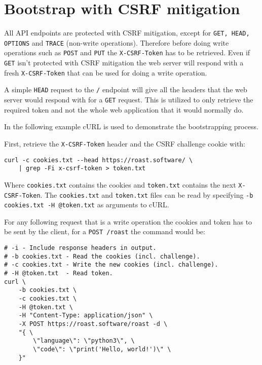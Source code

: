 \documentclass[12pt,a4paper]{report}
\begin{document}
\section{Bootstrap with CSRF mitigation}
\label{sec:api-bootstrap}
All API endpoints are protected with CSRF mitigation, except for \texttt{GET, HEAD, OPTIONS} and \texttt{TRACE} (non-write operations). Therefore before doing write operations such as \texttt{POST} and \texttt{PUT} the \texttt{X-CSRF-Token} has to be retrieved. Even if \texttt{GET} isn't protected with CSRF mitigation the web server will respond with a fresh \texttt{X-CSRF-Token} that can be used for doing a write operation.

A simple \texttt{HEAD} request to the \texttt{/} endpoint will give all the headers that the web server would respond with for a \texttt{GET} request. This is utilized to only retrieve the required token and not the whole web application that it would normally do.

In the following example cURL is used to demonstrate the bootstrapping process.

First, retrieve the \texttt{X-CSRF-Token} header and the CSRF challenge cookie with:
\begin{verbatim}
curl -c cookies.txt --head https://roast.software/ \
    | grep -Fi x-csrf-token > token.txt
\end{verbatim}
Where \texttt{cookies.txt} contains the cookies and \texttt{token.txt} contains the next \texttt{X-CSRF-Token}.
The \texttt{cookies.txt} and \texttt{token.txt} files can be read by specifying \texttt{-b cookies.txt -H @token.txt} as arguments to cURL.

\newpage
For any following request that is a write operation the cookies and token has to be sent by the client, for a \texttt{POST /roast} the command would be:
\begin{verbatim}
# -i - Include response headers in output.
# -b cookies.txt - Read the cookies (incl. challenge).
# -c cookies.txt - Write the new cookies (incl. challenge).
# -H @token.txt  - Read token.
curl \
    -b cookies.txt \
    -c cookies.txt \
    -H @token.txt \
    -H "Content-Type: application/json" \
    -X POST https://roast.software/roast -d \
    "{ \
        \"language\": \"python3\", \
        \"code\": \"print('Hello, world!')\" \
    }"
\end{verbatim}
\end{document}
